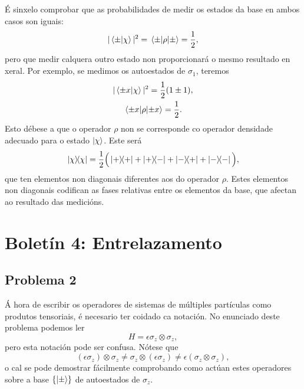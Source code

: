 \documentclass[a4paper,12pt]{article}
\begin{document}
É sinxelo comprobar que as probabilidades de medir os estados da base en ambos casos son iguais: 
\begin{equation}
\begin{gathered}
	|\braket{\pm}{\chi}|^2 = \mel{\pm}{\rho}{\pm} = \frac{1}{2},
\end{gathered}
\end{equation}
\noindent
pero que medir calquera outro estado non proporcionará o mesmo resultado en xeral. Por exemplo, se medimos os autoestados de $\sigma_1$, teremos
\begin{equation}
\begin{gathered}
	|\braket{\pm x}{\chi}|^2 = \frac{1}{2}(1 \pm 1), \\
	\mel{\pm x}{\rho}{\pm x} = \frac{1}{2}.
\end{gathered}
\end{equation}
\noindent
Esto débese a que o operador $\rho$ non se corresponde co operador densidade adecuado para o estado $\ket{\chi}$. Este será
\begin{equation}
	\ketbra{\chi} = \frac{1}{2} \Big ( \ketbra{+} + \ketbra{+}{-} + \ketbra{-}{+} + \ketbra{-} \Big ),
\end{equation}
\noindent
que ten elementos non diagonais diferentes aos do operador $\rho$. Estes elementos non diagonais codifican as fases relativas entre os elementos da base, que afectan ao resultado das medicións.

\newpage
\section*{Boletín 4: Entrelazamento}

\subsection*{Problema 2}

Á hora de escribir os operadores de sistemas de múltiples partículas como produtos tensoriais, é necesario ter coidado ca notación. No enunciado deste problema podemos ler
\begin{equation}
	H = \epsilon \sigma_z \otimes \sigma_z,
\end{equation}
\noindent
pero esta notación pode ser confusa. Nótese que
\begin{equation}
	(\epsilon \sigma_z) \otimes \sigma_z \neq \sigma_z \otimes (\epsilon \sigma_z) \neq \epsilon (\sigma_z \otimes \sigma_z),
\end{equation}
\noindent
o cal se pode demostrar fácilmente comprobando como actúan estes operadores sobre a base $\{\ket{\pm}\}$ de autoestados de $\sigma_z$.
\end{document}
